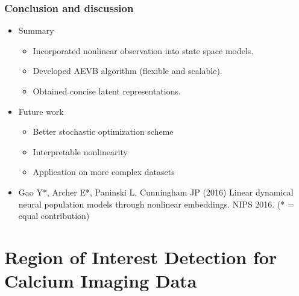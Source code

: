\documentclass[16pt,presentation]{beamer}
\begin{document}
\begin{frame}
\frametitle{Conclusion and discussion}
\begin{itemize}
\item Summary
\begin{itemize}
\item Incorporated nonlinear observation into state space models.
\item Developed AEVB algorithm (flexible and scalable).
\item Obtained concise latent representations.
\end{itemize}
\item Future work
\begin{itemize}
\item Better stochastic optimization scheme
\item Interpretable nonlinearity
\item Application on more complex datasets
\end{itemize}
\item \alert{Gao Y}*, Archer E*, Paninski L, Cunningham JP (2016) Linear dynamical neural population models through nonlinear embeddings. NIPS 2016. (* = equal contribution)
\end{itemize}
\end{frame}


\section[]{Region of Interest Detection for Calcium Imaging Data}
\end{document}
